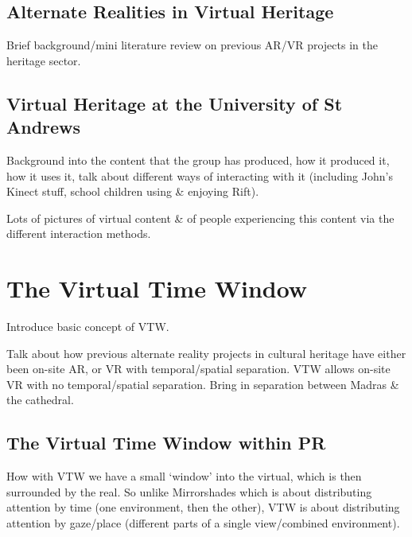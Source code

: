 \subsection{Alternate Realities in Virtual Heritage}

Brief background/mini literature review on previous AR/VR projects in the heritage sector.


\subsection{Virtual Heritage at the University of St Andrews}

Background into the content that the group has produced, how it produced it, how it uses it, talk about different ways of interacting with it (including John's Kinect stuff, school children using \& enjoying Rift).

Lots of pictures of virtual content \& of people experiencing this content via the different interaction methods.


\section{The Virtual Time Window}

Introduce basic concept of VTW.

Talk about how previous alternate reality projects in cultural heritage have either been on-site AR, or VR with temporal/spatial separation. VTW allows on-site VR with no temporal/spatial separation. Bring in separation between Madras \& the cathedral.


\subsection{The Virtual Time Window within PR}

How with VTW we have a small `window' into the virtual, which is then surrounded by the real. So unlike Mirrorshades which is about distributing attention by time (one environment, then the other), VTW is about distributing attention by gaze/place (different parts of a single view/combined environment).


